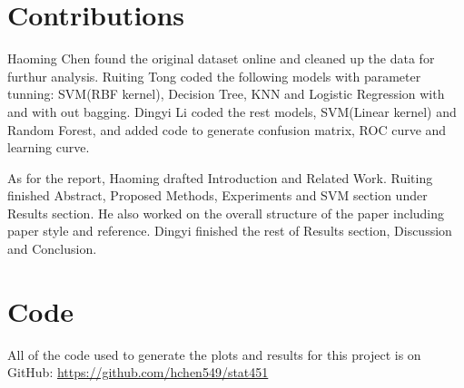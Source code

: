 \documentclass[10pt,twocolumn]{article}
\begin{document}
	
	
	\section{Contributions}
	Haoming Chen found the original dataset online and cleaned up the data for furthur analysis. Ruiting Tong coded the following models with parameter tunning: SVM(RBF kernel), Decision Tree, KNN and Logistic Regression with and with out bagging. Dingyi Li coded the rest models, SVM(Linear kernel) and Random Forest, and added code to generate confusion matrix, ROC curve and learning curve.

	As for the report, Haoming drafted Introduction and Related Work. Ruiting finished Abstract, Proposed Methods, Experiments and SVM section under Results section. He also worked on the overall structure of the paper including paper style and reference. Dingyi finished the rest of Results section, Discussion and Conclusion.
	\section{Code}
	All of the code used to generate the plots and results for this project is on GitHub: \url{https://github.com/hchen549/stat451}
	
		
	
\end{document}
